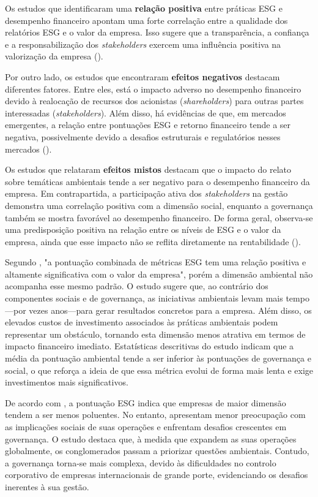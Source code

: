 Os estudos que identificaram uma \textbf{relação positiva} entre práticas ESG e desempenho financeiro apontam uma forte correlação entre a qualidade dos relatórios ESG e o valor da empresa. Isso sugere que a transparência, a confiança e a responsabilização dos \textit{stakeholders} exercem uma influência positiva na valorização da empresa (\cite{Aydomu2022}).

Por outro lado, os estudos que encontraram \textbf{efeitos negativos} destacam diferentes fatores. Entre eles, está o impacto adverso no desempenho financeiro devido à realocação de recursos dos acionistas (\textit{shareholders}) para outras partes interessadas (\textit{stakeholders}). Além disso, há evidências de que, em mercados emergentes, a relação entre pontuações ESG e retorno financeiro tende a ser negativa, possivelmente devido a desafios estruturais e regulatórios nesses mercados (\cite{Aydomu2022}).

Os estudos que relataram \textbf{efeitos mistos} destacam que o impacto do relato sobre temáticas ambientais tende a ser negativo para o desempenho financeiro da empresa. Em contrapartida, a participação ativa dos \textit{stakeholders} na gestão demonstra uma correlação positiva com a dimensão social, enquanto a governança também se mostra favorável ao desempenho financeiro. De forma geral, observa-se uma predisposição positiva na relação entre os níveis de ESG e o valor da empresa, ainda que esse impacto não se reflita diretamente na rentabilidade (\cite{Aydomu2022}).

Segundo \cite{Aydomu2022}, "a pontuação combinada de métricas ESG tem uma relação positiva e altamente significativa com o valor da empresa", porém a dimensão ambiental não acompanha esse mesmo padrão. O estudo sugere que, ao contrário dos componentes sociais e de governança, as iniciativas ambientais levam mais tempo—por vezes anos—para gerar resultados concretos para a empresa. Além disso, os elevados custos de investimento associados às práticas ambientais podem representar um obstáculo, tornando esta dimensão menos atrativa em termos de impacto financeiro imediato. Estatísticas descritivas do estudo indicam que a média da pontuação ambiental tende a ser inferior às pontuações de governança e social, o que reforça a ideia de que essa métrica evolui de forma mais lenta e exige investimentos mais significativos.

De acordo com \cite{Cohen2023}, a pontuação ESG indica que empresas de maior dimensão tendem a ser menos poluentes. No entanto, apresentam menor preocupação com as implicações sociais de suas operações e enfrentam desafios crescentes em governança. O estudo destaca que, à medida que expandem as suas operações globalmente, os conglomerados passam a priorizar questões ambientais. Contudo, a governança torna-se mais complexa, devido às dificuldades no controlo corporativo de empresas internacionais de grande porte, evidenciando os desafios inerentes à sua gestão.


